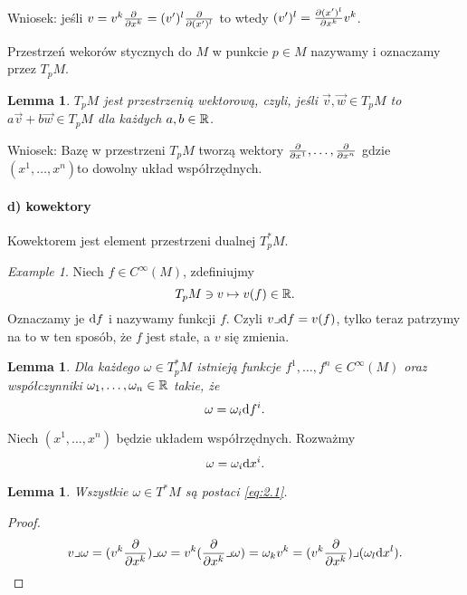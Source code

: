 \documentclass[11pt]{book}
\theoremstyle{definition} %
\theoremstyle{plain} %
\newtheorem{lemma}[theorem]{Lemma}
\theoremstyle{remark} %
\theoremstyle{underline}
\newtheorem{example}[theorem]{Example}
\begin{document}
  Wniosek: jeśli $v = v^k \frac{\partial }{\partial x^k} = (v')^l \frac{\partial }{\partial (x')^l}$ to wtedy $(v')^l = \frac{\partial (x')^l}{\partial x^k} v^k$.

  Przestrzeń wekorów stycznych do $M$ w punkcie $p \in M$ nazywamy  i oznaczamy 
  przez $T_pM$.

  \begin{lemma}
    $T_p M$ jest przestrzenią wektorową, czyli, jeśli $\vec v, \vec w \in T_pM$ to $ a\vec v + b \vec w \in T_pM$ 
    dla każdych $a, b\in \mathbb{R}$.
  \end{lemma}

  Wniosek: Bazę w przestrzeni $T_pM$ tworzą wektory $\frac{\partial }{\partial x^1}, \dots, \frac{\partial }{\partial x^n}$ gdzie 
  $(x^1, \dots, x^n)$to dowolny układ współrzędnych.

  \paragraph{d) kowektory}
  Kowektorem jest element przestrzeni dualnej $T^*_p M$.
  
  \begin{example}
    Niech $f \in C^\infty(M)$, zdefiniujmy
    \begin{displaymath}
      T_p M \ni v \mapsto v(f) \in \mathbb{R}.
    \end{displaymath}
    Oznaczamy je $\mathrm{d} f $ i nazywamy  funkcji $f$.
    Czyli $v\lrcorner \mathrm{d} f = v(f)$, tylko teraz patrzymy na to w ten sposób, że $f$ jest stałe, a $v$ się zmienia.
  \end{example}

  \begin{lemma}
    Dla każdego $\omega \in T_p^*M$ istnieją funkcje $f^1, \dots, f^n \in C^\infty(M)$ oraz współczynniki $\omega_1, \dots, \omega_n \in \mathbb{R}$
    takie, że
    \begin{displaymath}
      \omega = \omega_i \mathrm{d} f^i.
    \end{displaymath}
  \end{lemma}

  Niech $(x^1, \dots, x^n)$ będzie układem współrzędnych. Rozważmy
  \begin{equation}
    \omega = \omega_i \mathrm{d} x^i.
    \label{eq:2.1}
  \end{equation}
  
  \begin{lemma}
    Wszystkie $\omega \in T^*M$ są postaci \ref{eq:2.1}.
  \end{lemma}
  \begin{proof}
    \begin{displaymath}
      v \lrcorner \omega = (v^k\frac{\partial }{\partial x^k}) \lrcorner \omega 
      = v^k ( \frac{\partial }{\partial x^k} \lrcorner \omega) 
      = \omega_k v^k 
      = (v^k \frac{\partial }{\partial x^k}) \lrcorner(\omega_l \mathrm{d} x^l).
    \end{displaymath}
    
  \end{proof}
\end{document}
